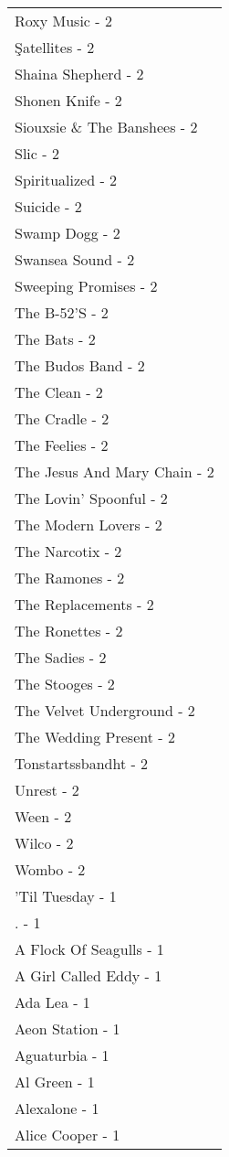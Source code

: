 \documentclass[
]{article}
\begin{document}
\begin{longtable}{l}
Roxy Music - 2 \\ 
Şatellites - 2 \\ 
Shaina Shepherd - 2 \\ 
Shonen Knife - 2 \\ 
Siouxsie \& The Banshees - 2 \\ 
Slic - 2 \\ 
Spiritualized - 2 \\ 
Suicide - 2 \\ 
Swamp Dogg - 2 \\ 
Swansea Sound - 2 \\ 
Sweeping Promises - 2 \\ 
The B-52'S - 2 \\ 
The Bats - 2 \\ 
The Budos Band - 2 \\ 
The Clean - 2 \\ 
The Cradle - 2 \\ 
The Feelies - 2 \\ 
The Jesus And Mary Chain - 2 \\ 
The Lovin' Spoonful - 2 \\ 
The Modern Lovers - 2 \\ 
The Narcotix - 2 \\ 
The Ramones - 2 \\ 
The Replacements - 2 \\ 
The Ronettes - 2 \\ 
The Sadies - 2 \\ 
The Stooges - 2 \\ 
The Velvet Underground - 2 \\ 
The Wedding Present - 2 \\ 
Tonstartssbandht - 2 \\ 
Unrest - 2 \\ 
Ween - 2 \\ 
Wilco - 2 \\ 
Wombo - 2 \\ 
'Til Tuesday - 1 \\ 
. - 1 \\ 
A Flock Of Seagulls - 1 \\ 
A Girl Called Eddy - 1 \\ 
Ada Lea - 1 \\ 
Aeon Station - 1 \\ 
Aguaturbia - 1 \\ 
Al Green - 1 \\ 
Alexalone - 1 \\ 
Alice Cooper - 1 \\ 

\end{longtable}
\end{document}
